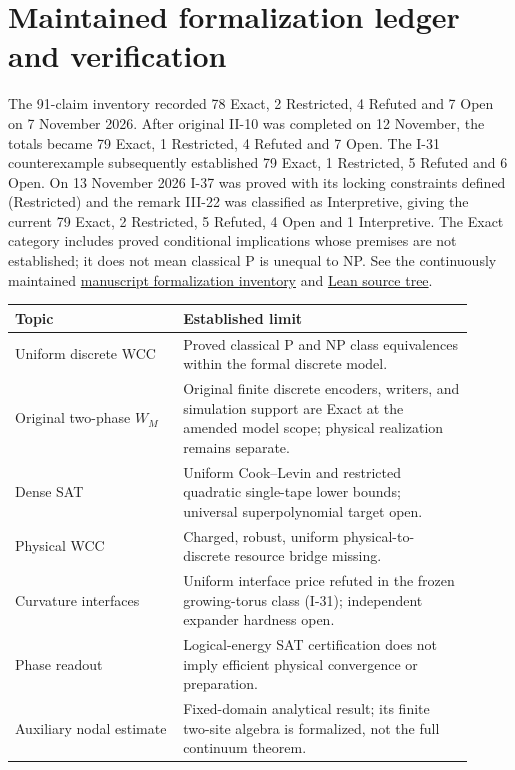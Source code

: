 \documentclass[11pt]{article}
\begin{document}
\section{Maintained formalization ledger and verification}
The 91-claim inventory recorded 78 Exact, 2 Restricted, 4 Refuted and 7 Open on 7 November 2026. After original II-10 was completed on 12 November, the totals became 79 Exact, 1 Restricted, 4 Refuted and 7 Open. The I-31 counterexample subsequently established 79 Exact, 1 Restricted, 5 Refuted and 6 Open. On 13 November 2026 I-37 was proved with its locking constraints defined (Restricted) and the remark III-22 was classified as Interpretive, giving the current 79 Exact, 2 Restricted, 5 Refuted, 4 Open and 1 Interpretive. The Exact category includes proved conditional implications whose premises are not established; it does not mean classical P is unequal to NP. See the continuously maintained \href{https://github.com/rickyjreyes/PVNP/blob/main/pvnp/proofs/manuscript-lean-inventory.md}{manuscript formalization inventory} and \href{https://github.com/rickyjreyes/PVNP/tree/main/lean}{Lean source tree}.

\begin{center}\small
\begin{tabular}{@{}p{0.33\linewidth}p{0.58\linewidth}@{}}\toprule
Topic & Established limit\\\midrule
Uniform discrete WCC & Proved classical P and NP class equivalences within the formal discrete model.\\
Original two-phase \(W_M\) & Original finite discrete encoders, writers, and simulation support are Exact at the amended model scope; physical realization remains separate.\\
Dense SAT & Uniform Cook--Levin and restricted quadratic single-tape lower bounds; universal superpolynomial target open.\\
Physical WCC & Charged, robust, uniform physical-to-discrete resource bridge missing.\\
Curvature interfaces & Uniform interface price refuted in the frozen growing-torus class (I-31); independent expander hardness open.\\
Phase readout & Logical-energy SAT certification does not imply efficient physical convergence or preparation.\\
Auxiliary nodal estimate & Fixed-domain analytical result; its finite two-site algebra is formalized, not the full continuum theorem.\\
\bottomrule\end{tabular}
\end{center}
\end{document}
